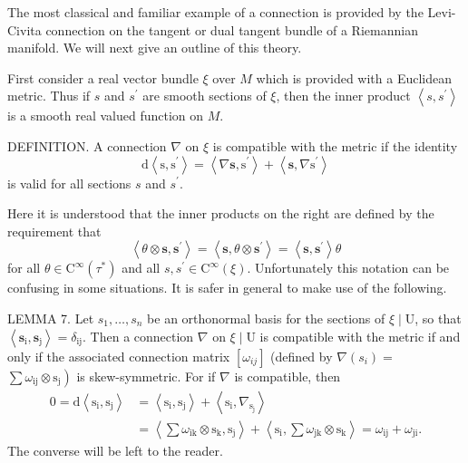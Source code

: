 \documentclass[10pt]{article}
\begin{document}
The most classical and familiar example of a connection is provided by the Levi-Civita connection on the tangent or dual tangent bundle of a Riemannian manifold. We will next give an outline of this theory.

First consider a real vector bundle $\xi$ over $M$ which is provided with a Euclidean metric. Thus if $s$ and $s^{\prime}$ are smooth sections of $\xi$, then the inner product $\left\langle s, s^{\prime}\right\rangle$ is a smooth real valued function on $M$.

DEFINITION. A connection $\nabla$ on $\xi$ is compatible with the metric if the identity
$$
\mathrm{d}\left\langle\mathrm{s}, \mathrm{s}^{\prime}\right\rangle=\left\langle\nabla \mathbf{s}, \mathrm{s}^{\prime}\right\rangle+\left\langle\mathbf{s}, \nabla \mathrm{s}^{\prime}\right\rangle
$$
is valid for all sections $s$ and $s^{\prime}$.

Here it is understood that the inner products on the right are defined by the requirement that
$$
\left\langle\theta \otimes \mathbf{s}, \mathbf{s}^{\prime}\right\rangle=\left\langle\mathbf{s}, \theta \otimes \mathbf{s}^{\prime}\right\rangle=\left\langle\mathbf{s}, \mathbf{s}^{\prime}\right\rangle \theta
$$
for all $\theta \in \mathrm{C}^{\infty}\left(\tau^{*}\right)$ and all $s, s^{\prime} \in \mathrm{C}^{\infty}(\xi)$. Unfortunately this notation can be confusing in some situations. It is safer in general to make use of the following.

LEMMA 7. Let $s_{1}, \ldots, s_{n}$ be an orthonormal basis for the sections of $\xi \mid \mathrm{U}$, so that $\left\langle\mathbf{s}_{\mathrm{i}}, \mathbf{s}_{\mathrm{j}}\right\rangle=\delta_{\mathrm{ij}}$. Then a connection $\nabla$ on $\xi \mid \mathrm{U}$ is compatible with the metric if and only if the associated connection matrix $\left[\omega_{i j}\right]$ (defined by $\nabla\left(s_{i}\right)=$ $\left.\sum \omega_{\mathrm{ij}} \otimes \mathrm{s}_{\mathrm{j}}\right)$ is skew-symmetric. For if $\nabla$ is compatible, then
$$
\begin{aligned}
0=\mathrm{d}\left\langle\mathrm{s}_{\mathrm{i}}, \mathrm{s}_{\mathrm{j}}\right\rangle &=\left\langle\mathrm{s}_{\mathrm{i}}, \mathrm{s}_{\mathrm{j}}\right\rangle+\left\langle\mathrm{s}_{\mathrm{i}}, \nabla_{\mathrm{s}_{\mathrm{j}}}\right\rangle \\
&=\left\langle\sum \omega_{\mathrm{ik}} \otimes \mathrm{s}_{\mathrm{k}}, \mathrm{s}_{\mathrm{j}}\right\rangle+\left\langle\mathrm{s}_{\mathrm{i}}, \sum \omega_{\mathrm{jk}} \otimes \mathrm{s}_{\mathrm{k}}\right\rangle=\omega_{\mathrm{ij}}+\omega_{\mathrm{ji}} .
\end{aligned}
$$
The converse will be left to the reader.
\end{document}
